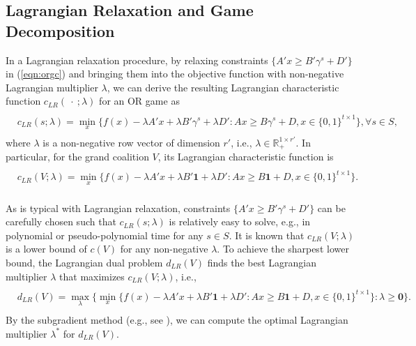 \documentclass[ijoc,nonblindrev]{informs3} %
\newcommand{\R}{\mathbb{R}}
\begin{document}
\subsection{Lagrangian Relaxation and Game Decomposition}\label{section:4_1}
In a Lagrangian relaxation procedure, by relaxing constraints $\{A'x \geq B'\gamma^s + D'\}$ in (\ref{eqn:orgc}) and bringing them into the objective function with non-negative Lagrangian multiplier $\lambda$, we can derive the resulting Lagrangian characteristic function $c_{LR}(\ \cdot\ ;\lambda)$ for an OR game as
\begin{eqnarray}\label{eqn:lagrangianfunction}
\begin{aligned}
\begin{split}
c_{LR}(s;\lambda) = \min_{x} \big\{ f(x)-\lambda A'x + \lambda B'\gamma^s + \lambda D':Ax \geq B \gamma^s + D, x \in \{0,1\}^{t \times 1} \big\}, \forall s \in S,
\end{split}
\end{aligned}
\end{eqnarray}
where $\lambda$ is a non-negative row vector of dimension $r'$, i.e., $\lambda \in \R_{+}^{1 \times r'}$. In particular, for the grand coalition $V$, its  Lagrangian characteristic function is
\begin{eqnarray*}\label{eqn:lagrangianfunctionN}
\begin{aligned}
\begin{split}
c_{LR}(V;\lambda) = \min_{x} \big\{ f(x)-\lambda A'x + \lambda B'\textbf{1}+ \lambda D':Ax \geq B\textbf{1} + D, x \in \{0,1\}^{t \times 1} \big\}.
\end{split}
\end{aligned}
\end{eqnarray*}

As is typical with Lagrangian relaxation, constraints $\{A'x \geq B'\gamma^s + D'\}$ can be carefully chosen such that $c_{LR}(s;\lambda)$ is relatively easy to solve, e.g., in polynomial or pseudo-polynomial time for any $s \in S$.
It is known that $c_{LR}(V;\lambda)$ is a lower bound of $c(V)$ for any non-negative $\lambda$. To achieve the sharpest  lower bound, the Lagrangian dual problem $d_{LR}(V)$ finds the best Lagrangian multiplier $\lambda$ that maximizes $c_{LR}(V;\lambda)$, i.e.,
\begin{eqnarray}\label{eqn:lagrangianfunctionmax}
\begin{aligned}
\begin{split}
d_{LR}(V) = \max_{\lambda} \big\{ \min_{x} \big\{ f(x)-\lambda A'x + \lambda B'\textbf{1} + \lambda D':Ax \geq B\textbf{1} + D, x \in \{0,1\}^{t \times 1} \big\}:\lambda \geq \textbf{0} \big\}.
\end{split}
\end{aligned}
\end{eqnarray}
By the subgradient method (e.g., see \citealt{Ahuja1993NetworkBook}), we can compute the optimal Lagrangian multiplier $\lambda^*$ for $d_{LR}(V)$.
\end{document}
